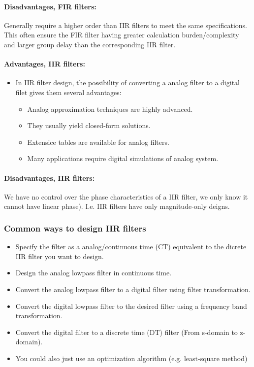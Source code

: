 \documentclass{article}
\begin{document}
\paragraph{Disadvantages, FIR filters:}

Generally require a higher order than IIR filters to meet the same specifications. This often ensure the FIR filter having greater calculation burden/complexity and larger group delay than the corresponding IIR filter.

\paragraph{Advantages, IIR filters:}
\begin{itemize}
    \item In IIR filter design, the possibility of converting a analog filter to a digital filet gives them several advantages:
    \begin{itemize}
        \item Analog approximation techniques are highly advanced.
        \item They usually yield closed-form solutions.
        \item Extensice tables are available for analog filters.
        \item Many applications require digital simulations of analog system.
    \end{itemize}
\end{itemize}

\paragraph{Disadvantages, IIR filters:}
We have no control over the phase characteristics of a IIR filter, we only know it cannot have linear phase). I.e. IIR filters have only magnitude-only deigns.

\subsubsection{Common ways to design IIR filters}
\begin{itemize}
    \item Specify the filter as a analog/continuous time (CT) equivalent to the dicrete IIR filter you want to design.
    \item Design the analog lowpass filter in continuous time.
    \item Convert the analog lowpass filter to a digital filter using filter transformation.
    \item Convert the digital lowpass filter to the desired filter using a frequency band transformation.
    \item Convert the digital filter to a discrete time (DT) filter (From s-domain to z-domain).
    \item You could also just use an optimization algorithm (e.g. least-square method)
\end{itemize}
\end{document}

